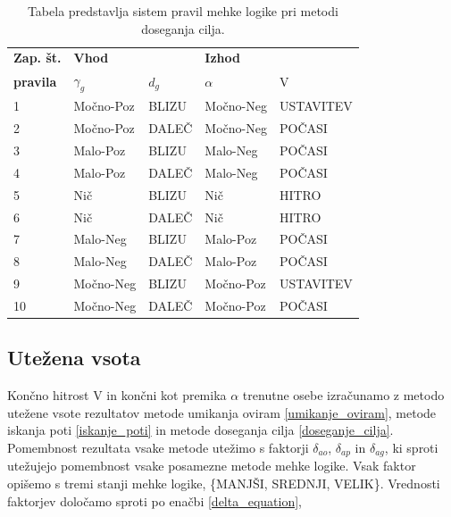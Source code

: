 \documentclass[9pt]{pnas-new}
\begin{document}
\begin{table}[]
\centering
\begin{tabular}{|l|ll|ll|}
\hline
\textbf{Zap. št.} & \multicolumn{2}{l|}{\textbf{Vhod}} & \multicolumn{2}{l|}{\textbf{Izhod}} \\ \cline{2-5} 
\textbf{pravila} & ${\gamma_{g}}$          & ${d_g}$          & ${\alpha}$           & V          \\ \hline
1                            & Močno-Poz  & BLIZU & Močno-Neg  & USTAVITEV  \\ \hline
2                            & Močno-Poz & DALEČ & Močno-Neg   &  POČASI           \\ \hline
3                            & Malo-Poz &  BLIZU &   Malo-Neg   &  POČASI   \\ \hline
4                            & Malo-Poz & DALEČ &  Malo-Neg  &  POČASI   \\ \hline
5                            & Nič      &  BLIZU &  Nič    &   HITRO    \\ \hline
6                            & Nič      & DALEČ  &  Nič    &   HITRO  \\ \hline
7                            & Malo-Neg & BLIZU & Malo-Poz    &  POČASI   \\ \hline
8                            & Malo-Neg & DALEČ & Malo-Poz   &  POČASI    \\ \hline
9                            & Močno-Neg & BLIZU &  Močno-Poz   & USTAVITEV \\ \hline
10                           & Močno-Neg & DALEČ  &  Močno-Poz   &  POČASI   \\ \hline
\end{tabular}
\caption{Tabela predstavlja sistem pravil mehke logike pri metodi doseganja cilja.}
\label{rules_goal_seeking_behaviour}
\end{table}

\subsection*{Utežena vsota}
Končno hitrost V in končni kot premika ${\alpha}$ trenutne osebe izračunamo z metodo utežene vsote rezultatov metode umikanja oviram \ref{umikanje_oviram}, metode iskanja poti \ref{iskanje_poti} in metode doseganja cilja \ref{doseganje_cilja}. Pomembnost rezultata vsake metode utežimo s faktorji ${\delta_{ao}}$, ${\delta_{ap}}$ in ${\delta_{ag}}$, ki sproti utežujejo pomembnost vsake posamezne metode mehke logike. Vsak faktor opišemo s tremi stanji mehke logike, \{MANJŠI, SREDNJI, VELIK\}. Vrednosti faktorjev določamo sproti po enačbi \ref{delta_equation},
\end{document}
